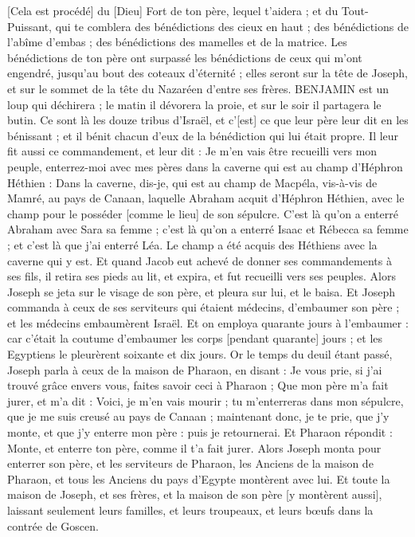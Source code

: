 \begin{multicols}{2}
[Cela est procédé] du [Dieu] Fort de ton père, lequel t'aidera ; et du Tout-Puissant, qui te comblera des bénédictions des cieux en haut ; des bénédictions de l'abîme d'embas ; des bénédictions des mamelles et de la matrice.
Les bénédictions de ton père ont surpassé les bénédictions de ceux qui m'ont engendré, jusqu'au bout des coteaux d'éternité ; elles seront sur la tête de Joseph, et sur le sommet de la tête du Nazaréen d'entre ses frères.
BENJAMIN est un loup qui déchirera ; le matin il dévorera la proie, et sur le soir il partagera le butin.
Ce sont là les douze tribus d'Israël, et c'[est] ce que leur père leur dit en les bénissant ; et il bénit chacun d'eux de la bénédiction qui lui était propre.
Il leur fit aussi ce commandement, et leur dit : Je m'en vais être recueilli vers mon peuple, enterrez-moi avec mes pères dans la caverne qui est au champ d'Héphron Héthien :
Dans la caverne, dis-je, qui est au champ de Macpéla, vis-à-vis de Mamré, au pays de Canaan, laquelle Abraham acquit d'Héphron Héthien, avec le champ pour le posséder [comme le lieu] de son sépulcre.
C'est là qu'on a enterré Abraham avec Sara sa femme ; c'est là qu'on a enterré Isaac et Rébecca sa femme ; et c'est là que j'ai enterré Léa.
Le champ a été acquis des Héthiens avec la caverne qui y est.
Et quand Jacob eut achevé de donner ses commandements à ses fils, il retira ses pieds au lit, et expira, et fut recueilli vers ses peuples.
\VerseOne{}Alors Joseph se jeta sur le visage de son père, et pleura sur lui, et le baisa.
Et Joseph commanda à ceux de ses serviteurs qui étaient médecins, d'embaumer son père ; et les médecins embaumèrent Israël.
Et on employa quarante jours à l'embaumer : car c'était la coutume d'embaumer les corps [pendant quarante] jours ; et les Egyptiens le pleurèrent soixante et dix jours.
Or le temps du deuil étant passé, Joseph parla à ceux de la maison de Pharaon, en disant : Je vous prie, si j'ai trouvé grâce envers vous, faites savoir ceci à Pharaon ;
Que mon père m'a fait jurer, et m'a dit : Voici, je m'en vais mourir ; tu m'enterreras dans mon sépulcre, que je me suis creusé au pays de Canaan ; maintenant donc, je te prie, que j'y monte, et que j'y enterre mon père : puis je retournerai.
Et Pharaon répondit : Monte, et enterre ton père, comme il t'a fait jurer.
Alors Joseph monta pour enterrer son père, et les serviteurs de Pharaon, les Anciens de la maison de Pharaon, et tous les Anciens du pays d'Egypte montèrent avec lui.
Et toute la maison de Joseph, et ses frères, et la maison de son père [y montèrent aussi], laissant seulement leurs familles, et leurs troupeaux, et leurs bœufs dans la contrée de Goscen.

\end{multicols}
